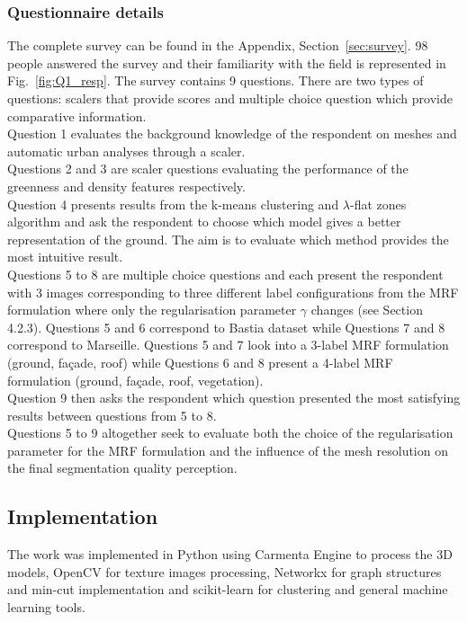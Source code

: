 \documentclass{kththesis}
\begin{document}
\subsubsection{Questionnaire details}
The complete survey can be found in the Appendix, Section~\ref{sec:survey}. 98 people answered the survey and their familiarity with the field is represented in Fig.~\ref{fig:Q1_resp}. The survey contains 9 questions. There are two types of questions: scalers that provide scores and multiple choice question which provide comparative information. \\
Question 1 evaluates the background knowledge of the respondent on meshes and automatic urban analyses through a scaler. \\
Questions 2 and 3 are scaler questions evaluating the performance of the greenness and density features respectively. \\
Question 4 presents results from the k-means clustering and $\lambda$-flat zones algorithm and ask the respondent to choose which model gives a better representation of the ground. The aim is to evaluate which method provides the most intuitive result. \\
Questions 5 to 8 are multiple choice questions and each present the respondent with 3 images corresponding to three different label configurations from the MRF formulation where only the regularisation parameter $\gamma$ changes (see Section 4.2.3). Questions 5 and 6 correspond to Bastia dataset while Questions 7 and 8 correspond to Marseille. Questions 5 and 7 look into a 3-label MRF formulation (ground, façade, roof) while Questions 6 and 8 present a 4-label MRF formulation (ground, façade, roof, vegetation). \\
Question 9 then asks the respondent which question presented the most satisfying results between questions from 5 to 8. \\
Questions 5 to 9 altogether seek to evaluate both the choice of the regularisation parameter for the MRF formulation and the influence of the mesh resolution on the final segmentation quality perception. 

\subsection{Implementation}
The work was implemented in Python using Carmenta Engine to process the 3D models, OpenCV for texture images processing, Networkx for graph structures and min-cut implementation and scikit-learn  for clustering and general machine learning tools.   
\end{document}
